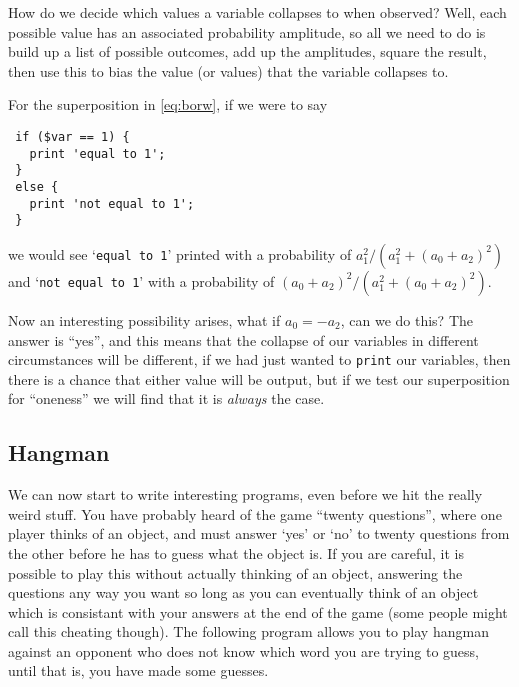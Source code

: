\documentclass{article}      %
\newcommand{\ptt}[1]{\texttt{#1}}    %
\begin{document}
How do we decide which values a variable collapses to when observed?
Well, each possible value has an associated probability amplitude, so
all we need to do is build up a list of possible outcomes, add up the
amplitudes, square the result, then use this to bias the value (or
values) that the variable collapses to.

For the superposition in \ref{eq:borw}, if we were to say
\begin{verbatim}
 if ($var == 1) {
   print 'equal to 1';
 }
 else {
   print 'not equal to 1';
 }
\end{verbatim} %
we would see `\ptt{equal to 1}' printed with a probability of
	$a_1^2 / (a_1^2 + (a_0 + a_2)^2)$
and `\ptt{not equal to 1}' with a probability of
	$(a_0+a_2)^2 / (a_1^2 + (a_0 + a_2)^2)$.

Now an interesting
possibility arises, what if $a_0 = -a_2$, can we do this?  The answer
is ``yes'', and this means that the collapse of our variables in
different circumstances will be different, if we had just wanted to
\ptt{print} our variables, then there is a chance that either value
will be output, but if we test our superposition for ``oneness''
we will find that it is \emph{always} the case.

\subsection{Hangman}
\label{sec:hangman}
We can now start to write interesting programs, even before we hit the
really weird stuff.  You have probably heard of the game ``twenty
questions'', where one player thinks of an object, and must answer
`yes' or `no' to twenty questions  from the other before he has to
guess what the object is.  If you
are careful, it is possible to play this without actually thinking of
an object, answering the questions any way you want so long as you can
eventually think of an object which is consistant with your answers at
the end of the game (some people might call this cheating though).
The following program allows you to play hangman against an opponent
who does not know which word you are trying to guess, until that is,
you have made some guesses.
\end{document}
